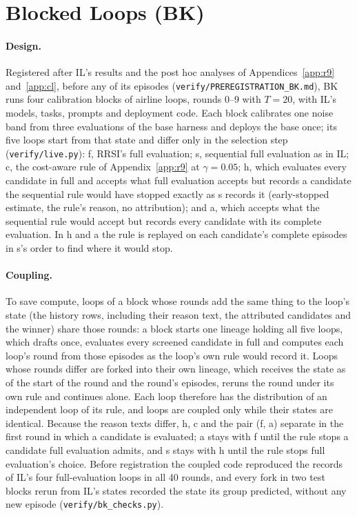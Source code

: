 \documentclass[11pt]{article}
\begin{document}
\section{Blocked Loops (BK)}
\label{app:bk}

\paragraph{Design.} Registered after IL's results and the post hoc analyses of Appendices~\ref{app:r9} and~\ref{app:cl}, before any of its episodes (\texttt{verify/PREREGISTRATION\_BK.md}), BK runs four calibration blocks of airline loops, rounds 0--9 with $T=20$, with IL's models, tasks, prompts and deployment code. Each block calibrates one noise band from three evaluations of the base harness and deploys the base once; its five loops start from that state and differ only in the selection step (\texttt{verify/live.py}): f, RRSI's full evaluation; s, sequential full evaluation as in IL; c, the cost-aware rule of Appendix~\ref{app:r9} at $\gamma=0.05$; h, which evaluates every candidate in full and accepts what full evaluation accepts but records a candidate the sequential rule would have stopped exactly as s records it (early-stopped estimate, the rule's reason, no attribution); and a, which accepts what the sequential rule would accept but records every candidate with its complete evaluation. In h and a the rule is replayed on each candidate's complete episodes in s's order to find where it would stop.

\paragraph{Coupling.} To save compute, loops of a block whose rounds add the same thing to the loop's state (the history rows, including their reason text, the attributed candidates and the winner) share those rounds: a block starts one lineage holding all five loops, which drafts once, evaluates every screened candidate in full and computes each loop's round from those episodes as the loop's own rule would record it. Loops whose rounds differ are forked into their own lineage, which receives the state as of the start of the round and the round's episodes, reruns the round under its own rule and continues alone. Each loop therefore has the distribution of an independent loop of its rule, and loops are coupled only while their states are identical. Because the reason texts differ, h, c and the pair (f, a) separate in the first round in which a candidate is evaluated; a stays with f until the rule stops a candidate full evaluation admits, and s stays with h until the rule stops full evaluation's choice. Before registration the coupled code reproduced the records of IL's four full-evaluation loops in all 40 rounds, and every fork in two test blocks rerun from IL's states recorded the state its group predicted, without any new episode (\texttt{verify/bk\_checks.py}).
\end{document}
